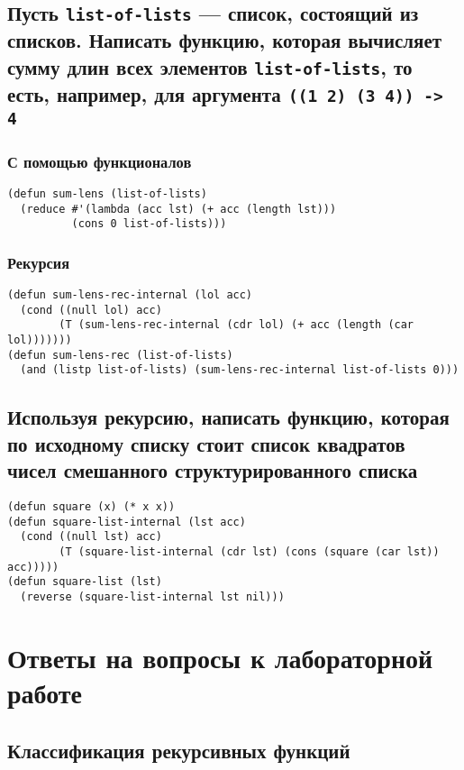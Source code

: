 \section{Пусть \texttt{list-of-lists} --- список, состоящий из списков. Написать функцию, которая вычисляет сумму длин всех элементов \texttt{list-of-lists}, то есть, например, для аргумента \texttt{((1 2) (3 4)) -> 4}}

\subsection{С помощью функционалов}

\begin{lstlisting}
(defun sum-lens (list-of-lists)
  (reduce #'(lambda (acc lst) (+ acc (length lst)))
          (cons 0 list-of-lists)))
\end{lstlisting}

\subsection{Рекурсия}

\begin{lstlisting}
(defun sum-lens-rec-internal (lol acc)
  (cond ((null lol) acc)
        (T (sum-lens-rec-internal (cdr lol) (+ acc (length (car lol)))))))
(defun sum-lens-rec (list-of-lists)
  (and (listp list-of-lists) (sum-lens-rec-internal list-of-lists 0)))
\end{lstlisting}

\section{Используя рекурсию, написать функцию, которая по исходному списку стоит список квадратов чисел смешанного структурированного списка}

\begin{lstlisting}
(defun square (x) (* x x))
(defun square-list-internal (lst acc)
  (cond ((null lst) acc)
        (T (square-list-internal (cdr lst) (cons (square (car lst)) acc)))))
(defun square-list (lst)
  (reverse (square-list-internal lst nil)))
\end{lstlisting}

\chapter{Ответы на вопросы к лабораторной работе}

\section{Классификация рекурсивных функций}

